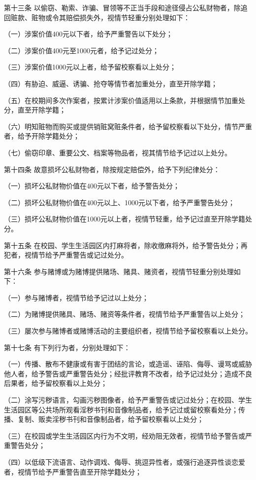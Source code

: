 \documentclass[UTF8,12pt,a4paper]{report}
\begin{document}
第十三条  以偷窃、勒索、诈骗、冒领等不正当手段和途径侵占公私财物者，除追回赃款、赃物或令其赔偿损失外，视情节轻重分别处理如下：

（一）涉案价值400元以下者，给予严重警告以下处分；

（二）涉案价值400元至1000元者，给予记过处分；

（三）涉案价值1000元以上者，给予留校察看以上处分；

（四）有胁迫、威逼、诱骗、抢夺等情节者加重处分，直至开除学籍；

（五）在校期间多次作案者，按累计涉案价值适用以上条款，并根据情节加重处分，直至开除学籍； 

（六）明知赃物而购买或提供销赃窝赃条件者，给予留校察看以下处分，情节严重者，给予开除学籍处分；

（七）偷窃印章、重要公文、档案等物品者，视其情节给予记过以上处分。

第十四条  故意损坏公私财物者，除按规定赔偿外，给予下列纪律处分：

（一）损坏公私财物价值在400元以下者，给予警告处分；

（二）损坏公私财物价值在400元以上、1000元以下者，给予严重警告处分；

（三）损坏公私财物价值在1000元以上者，视情节轻重，给予记过直至开除学籍处分。

第十五条  在校园、学生生活园区内打麻将者，除收缴麻将外，给予警告处分；再犯者，视情节给予严重警告或记过处分。

第十六条  参与赌博或为赌博提供赌场、赌具、赌资者，视情节轻重分别处理如下：

（一）参与赌博者，视情节给予记过以上处分；

（二）为赌博提供赌具、赌场、赌资等条件者，视情节给予严重警告以上处分；

（三）屡次参与赌博者或赌博活动的主要组织者，视情节给予留校察看以上处分。

第十七条  有下列行为者，分别处理如下：

（一）传播、散布不健康或有害于团结的言论，或造谣、诬陷、侮辱、谩骂或威胁他人者，给予警告或严重警告处分；经批评教育不改者，给予记过处分；造成不良后果者，给予留校察看以上处分；

（二）涂写污秽语言，勾画污秽图像者，给予严重警告或记过处分；在校园、学生生活园区等公共场所观看淫秽书刊和音像制品者，给予记过或留校察看处分；传播、复制、贩卖淫秽书刊和音像制品者，给予留校察看以上处分； 

（三）在校园或学生生活园区内行为不文明，经劝阻无效者，视情节给予警告或严重警告处分；

（四）以低级下流语言、动作调戏、侮辱、挑逗异性者，或强行追逐异性谈恋爱者，视情节给予严重警告直至开除学籍处分；
\end{document}
